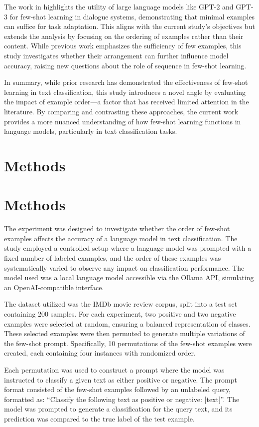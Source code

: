 \documentclass{article}
\begin{document}
The work in \citet{2008.06239v2} highlights the utility of large language models like GPT-2 and GPT-3 for few-shot learning in dialogue systems, demonstrating that minimal examples can suffice for task adaptation. This aligns with the current study's objectives but extends the analysis by focusing on the ordering of examples rather than their content. While previous work emphasizes the sufficiency of few examples, this study investigates whether their arrangement can further influence model accuracy, raising new questions about the role of sequence in few-shot learning.

In summary, while prior research has demonstrated the effectiveness of few-shot learning in text classification, this study introduces a novel angle by evaluating the impact of example order—a factor that has received limited attention in the literature. By comparing and contrasting these approaches, the current work provides a more nuanced understanding of how few-shot learning functions in language models, particularly in text classification tasks.
\section{Methods}
\section{Methods}

The experiment was designed to investigate whether the order of few-shot examples affects the accuracy of a language model in text classification. The study employed a controlled setup where a language model was prompted with a fixed number of labeled examples, and the order of these examples was systematically varied to observe any impact on classification performance. The model used was a local language model accessible via the Ollama API, simulating an OpenAI-compatible interface. 

The dataset utilized was the IMDb movie review corpus, split into a test set containing 200 samples. For each experiment, two positive and two negative examples were selected at random, ensuring a balanced representation of classes. These selected examples were then permuted to generate multiple variations of the few-shot prompt. Specifically, 10 permutations of the few-shot examples were created, each containing four instances with randomized order. 

Each permutation was used to construct a prompt where the model was instructed to classify a given text as either positive or negative. The prompt format consisted of the few-shot examples followed by an unlabeled query, formatted as: “Classify the following text as positive or negative: [text]”. The model was prompted to generate a classification for the query text, and its prediction was compared to the true label of the test example. 
\end{document}
